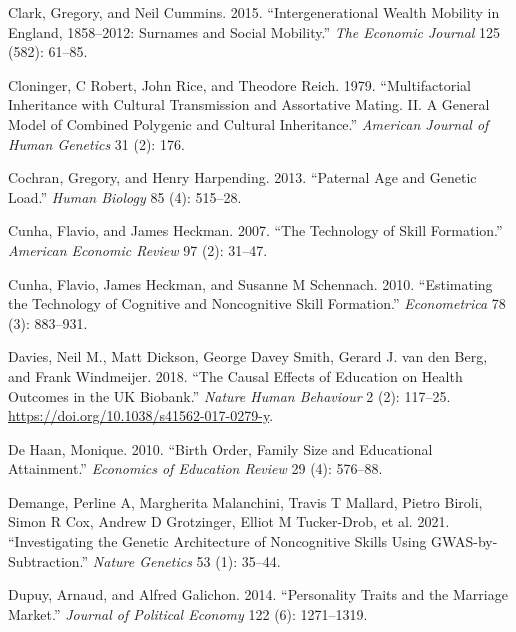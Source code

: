 \documentclass[
  12pt,
]{article}
\newlength{\cslhangindent}
\newlength{\cslentryspacingunit} %
\newenvironment{CSLReferences}[2] %
 {%
  \setlength{\parindent}{0pt}
  \ifodd #1
  \let\oldpar\par
  \def\par{\hangindent=\cslhangindent\oldpar}
  \fi
  \setlength{\parskip}{#2\cslentryspacingunit}
 }%
 {}
\theoremstyle{definition}
\theoremstyle{definition}
\theoremstyle{definition}
\theoremstyle{definition}
\theoremstyle{remark}
\begin{document}
\begin{CSLReferences}{1}{0}
\leavevmode{}%
Clark, Gregory, and Neil Cummins. 2015. {``Intergenerational Wealth Mobility in England, 1858--2012: Surnames and Social Mobility.''} \emph{The Economic Journal} 125 (582): 61--85.

\leavevmode{}%
Cloninger, C Robert, John Rice, and Theodore Reich. 1979. {``Multifactorial Inheritance with Cultural Transmission and Assortative Mating. II. A General Model of Combined Polygenic and Cultural Inheritance.''} \emph{American Journal of Human Genetics} 31 (2): 176.

\leavevmode{}%
Cochran, Gregory, and Henry Harpending. 2013. {``Paternal Age and Genetic Load.''} \emph{Human Biology} 85 (4): 515--28.

\leavevmode{}%
Cunha, Flavio, and James Heckman. 2007. {``The Technology of Skill Formation.''} \emph{American Economic Review} 97 (2): 31--47.

\leavevmode{}%
Cunha, Flavio, James Heckman, and Susanne M Schennach. 2010. {``Estimating the Technology of Cognitive and Noncognitive Skill Formation.''} \emph{Econometrica} 78 (3): 883--931.

\leavevmode{}%
Davies, Neil M., Matt Dickson, George Davey Smith, Gerard J. van den Berg, and Frank Windmeijer. 2018. {``The Causal Effects of Education on Health Outcomes in the {UK} Biobank.''} \emph{Nature Human Behaviour} 2 (2): 117--25. \url{https://doi.org/10.1038/s41562-017-0279-y}.

\leavevmode{}%
De Haan, Monique. 2010. {``Birth Order, Family Size and Educational Attainment.''} \emph{Economics of Education Review} 29 (4): 576--88.

\leavevmode{}%
Demange, Perline A, Margherita Malanchini, Travis T Mallard, Pietro Biroli, Simon R Cox, Andrew D Grotzinger, Elliot M Tucker-Drob, et al. 2021. {``Investigating the Genetic Architecture of Noncognitive Skills Using GWAS-by-Subtraction.''} \emph{Nature Genetics} 53 (1): 35--44.

\leavevmode{}%
Dupuy, Arnaud, and Alfred Galichon. 2014. {``Personality Traits and the Marriage Market.''} \emph{Journal of Political Economy} 122 (6): 1271--1319.


\end{CSLReferences}
\end{document}
